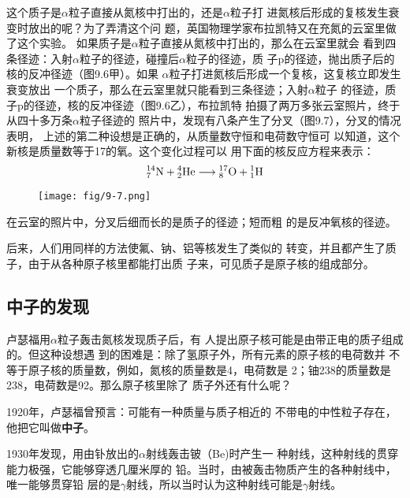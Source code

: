 这个质子是$\alpha$粒子直接从氮核中打出的，还是$\alpha$粒子打
进氮核后形成的复核发生衰变时放出的呢？为了弄清这个问
题，英国物理学家布拉凯特又在充氮的云室里做了这个实验。
如果质子是$\alpha$粒子直接从氮核中打出的，那么在云室里就会
看到四条径迹：入射$\alpha$粒子的径迹，碰撞后$\alpha$粒子的径迹，质
子p的径迹，抛出质子后的核的反冲径迹（图9.6甲）。如果
$\alpha$粒子打进氮核后形成一个复核，这复核立即发生衰变放出
一个质子，那么在云室里就只能看到三条径迹；入射$\alpha$粒子
的径迹，质子p的径迹，核的反冲径迹（图9.6乙），布拉凯特
拍摄了两万多张云室照片，终于从四十多万条$\alpha$粒子径迹的
照片中，发现有八条产生了分叉（图9.7），分叉的情况表明，
上述的第二种设想是正确的，从质量数守恒和电荷数守恒可
以知道，这个新核是质量数等于17的氧。这个变化过程可以
用下面的核反应方程来表示：
\[\atom{N}{14}{7}+\atom{He}{4}{2}\longrightarrow \atom{O}{17}{8}+\atom{H}{1}{1} \]
\begin{figure}[htp]\centering
\texttt{[image: fig/9-7.png]}
\caption{}
\end{figure}

在云室的照片中，分叉后细而长的是质子的径迹；短而粗
的是反冲氧核的径迹。

后来，人们用同样的方法使氟、钠、铝等核发生了类似的
转变，并且都产生了质子，由于从各种原子核里都能打出质
子来，可见质子是原子核的组成部分。

\subsection{中子的发现}

卢瑟福用$\alpha$粒子轰击氮核发现质子后，有
人提出原子核可能是由带正电的质子组成的。但这种设想遇
到的困难是：除了氢原子外，所有元素的原子核的电荷数并
不等于原子核的质量数，例如，氮核的质量数是4，电荷数是
2；铀238的质量数是238，电荷数是92。那么原子核里除了
质子外还有什么呢？

1920年，卢瑟福曾预言：可能有一种质量与质子相近的
不带电的中性粒子存在，他把它叫做\textbf{中子}。

1930年发现，用由钋放出的$\alpha$射线轰击铍（Be)时产生一
种射线，这种射线的贯穿能力极强，它能够穿透几厘米厚的
铅。当时，由被轰击物质产生的各种射线中，唯一能够贯穿铅
层的是$\gamma$射线，所以当时认为这种射线可能是$\gamma$射线。

